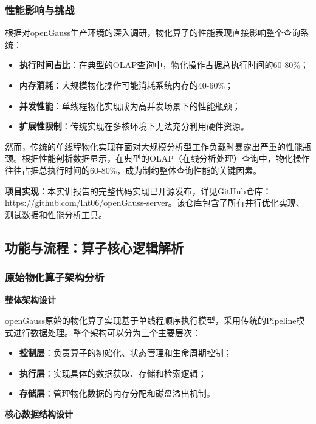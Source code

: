 \subsubsection{性能影响与挑战}

根据对openGauss生产环境的深入调研，物化算子的性能表现直接影响整个查询系统：

\begin{itemize}
    \item \textbf{执行时间占比}：在典型的OLAP查询中，物化操作占据总执行时间的60-80\%；
    \item \textbf{内存消耗}：大规模物化操作可能消耗系统内存的40-60\%；
    \item \textbf{并发性能}：单线程物化实现成为高并发场景下的性能瓶颈；
    \item \textbf{扩展性限制}：传统实现在多核环境下无法充分利用硬件资源。
\end{itemize}

然而，传统的单线程物化实现在面对大规模分析型工作负载时暴露出严重的性能瓶颈。根据性能剖析数据显示，在典型的OLAP（在线分析处理）查询中，物化操作往往占据总执行时间的60-80\%，成为制约整体查询性能的关键因素。

\textbf{项目实现}：本实训报告的完整代码实现已开源发布，详见GitHub仓库：\url{https://github.com/lht06/openGauss-server}。该仓库包含了所有并行优化实现、测试数据和性能分析工具。

\subsection{功能与流程：算子核心逻辑解析}

\subsubsection{原始物化算子架构分析}

\textbf{整体架构设计}

openGauss原始的物化算子实现基于单线程顺序执行模型，采用传统的Pipeline模式进行数据处理。整个架构可以分为三个主要层次：

\begin{itemize}
    \item \textbf{控制层}：负责算子的初始化、状态管理和生命周期控制；
    \item \textbf{执行层}：实现具体的数据获取、存储和检索逻辑；
    \item \textbf{存储层}：管理物化数据的内存分配和磁盘溢出机制。
\end{itemize}

\textbf{核心数据结构设计}

